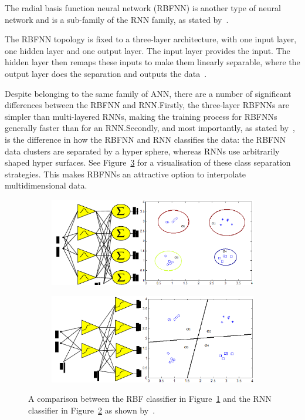 The radial basis function neural network (RBFNN) is another type of neural network and is a sub-family of the RNN family, as stated by~\cite{wilamowski1996implementation}. 

The RBFNN topology is fixed to a three-layer architecture, with one input layer, one hidden layer and one output layer. The input layer provides the input. The hidden layer then remaps these inputs to make them linearly separable, where the output layer does the separation and outputs the data~\citep{xie2011comparison}.  

Despite belonging to the same family of ANN, there are a number of significant differences between the RBFNN and RNN.\@ Firstly, the three-layer RBFNNs are simpler than multi-layered RNNs, making the training process for RBFNNs generally faster than for an RNN.\@ Secondly, and most importantly, as stated by~\citeauthor{xie2011comparison}, is the difference in how the RBFNN and RNN classifies the data: the RBFNN data clusters are separated by a hyper sphere, whereas RNNs use arbitrarily shaped hyper surfaces. See Figure~\ref{fig:chap2-classifier} for a visualisation of these class separation strategies. This makes RBFNNs an attractive option to interpolate multidimensional data.

\begin{figure}
  \centering
  \begin{subfigure}{0.5\textwidth}
    \includegraphics[width=\textwidth]{figures/chapter2/rbf_class}
    \caption{}
    \label{fig:chap2-rbf-classifier}
  \end{subfigure}
  \begin{subfigure}{0.5\textwidth}
    \includegraphics[width=\textwidth]{figures/chapter2/rnn_class}
    \caption{}
    \label{fig:chap2-rnn-classifier}
  \end{subfigure}
  \caption[Comparison between the RBF and RNN classifiers. ]{A comparison between the RBF classifier in Figure~\ref{fig:chap2-rbf-classifier} and the RNN classifier in Figure~\ref{fig:chap2-rnn-classifier} as shown by~\cite{xie2011comparison}. }
\label{fig:chap2-classifier}
\end{figure}

